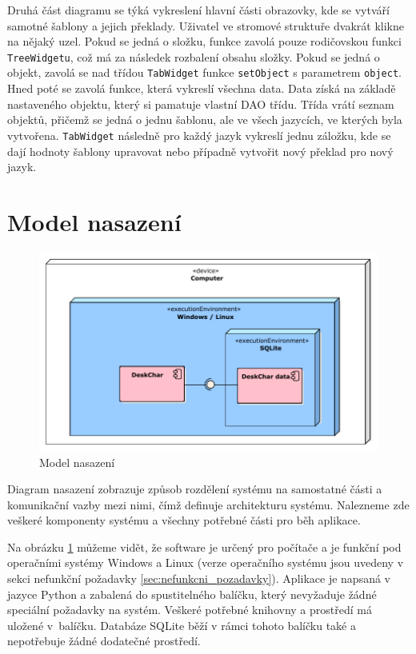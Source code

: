 \documentclass[thesis=B,czech]{resources/FITthesis}[2012/06/26]
\begin{document}
Druhá část diagramu se týká vykreslení hlavní části obrazovky, kde se vytváří samotné šablony a jejich překlady. Uživatel ve stromové struktuře dvakrát klikne na nějaký uzel. Pokud se jedná o složku, funkce zavolá pouze rodičovskou funkci \texttt{TreeWidgetu}, což má za následek rozbalení obsahu složky. Pokud se jedná o objekt, zavolá se nad třídou \texttt{TabWidget} funkce \texttt{setObject} s parametrem \texttt{object}. Hned poté se zavolá funkce, která vykreslí všechna data. Data získá na základě nastaveného objektu, který si pamatuje vlastní DAO třídu. Třída vrátí seznam objektů, přičemž se jedná o jednu šablonu, ale ve všech jazycích, ve kterých byla vytvořena. \texttt{TabWidget} následně pro každý jazyk vykreslí jednu záložku, kde se dají hodnoty šablony upravovat nebo případně vytvořit nový překlad pro nový jazyk.
	
	\section{Model nasazení}
	\begin{figure}\centering
	\includegraphics[width=1\textwidth]{images/model_nasazeni}
	\caption[Model nasazení]{Model nasazení}\label{fig:model_nasazeni}
	\end{figure}
Diagram nasazení zobrazuje způsob rozdělení systému na samostatné části a komunikační vazby mezi nimi, čímž definuje architekturu systému. Nalezneme zde veškeré komponenty systému a všechny potřebné části pro běh aplikace.\par

Na obrázku \ref{fig:model_nasazeni} můžeme vidět, že software je určený pro počítače a je funkční pod operačními systémy Windows a Linux (verze operačního systému jsou uvedeny v sekci nefunkční požadavky \ref{sec:nefunkcni_pozadavky}). Aplikace je napsaná v jazyce Python a zabalená do spustitelného balíčku, který nevyžaduje žádné speciální požadavky na systém. Veškeré potřebné knihovny a prostředí má uložené v~balíčku. Databáze SQLite běží v rámci tohoto balíčku také a nepotřebuje žádné dodatečné prostředí.
\end{document}
